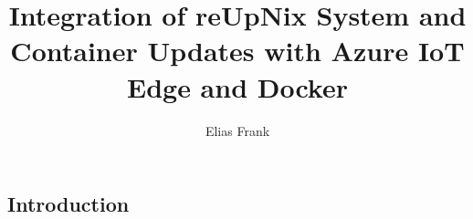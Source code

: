 \documentclass{article}
\author{Elias Frank}
\title{Integration of reUpNix System and Container Updates with Azure IoT Edge and Docker}
\begin{document}
\maketitle
\begin{multicols}{2}
    \begin{abstract}
        {
        \selectfont
        
        }
    \end{abstract}
\section{Introduction}

% 




\end{multicols}


\printbibliography
\end{document}
